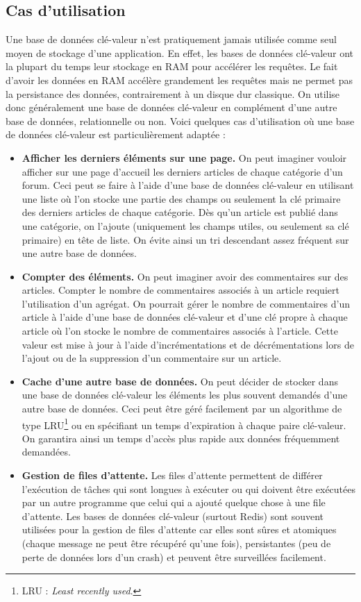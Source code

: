 \subsection{Cas d'utilisation}
	Une base de données clé-valeur n'est pratiquement jamais utilisée comme seul moyen de stockage d'une application. En effet, les bases de données clé-valeur ont la plupart du temps leur stockage en RAM pour accélérer les requêtes. Le fait d'avoir les données en RAM accélère grandement les requêtes mais ne permet pas la persistance des données, contrairement à un disque dur classique. On utilise donc généralement une base de données clé-valeur en complément d'une autre base de données, relationnelle ou non. Voici quelques cas d'utilisation où une base de données clé-valeur est particulièrement adaptée :
	\vspace{10px}
	\begin{itemize}
	 	\item \textbf{Afficher les derniers éléments sur une page.} On peut imaginer vouloir afficher sur une page d'accueil les derniers articles de chaque catégorie d'un forum. Ceci peut se faire à l'aide d'une base de données clé-valeur en utilisant une liste où l'on stocke une partie des champs ou seulement la clé primaire des derniers articles de chaque catégorie. Dès qu'un article est publié dans une catégorie, on l'ajoute (uniquement les champs utiles, ou seulement sa clé primaire) en tête de liste. On évite ainsi un tri descendant assez fréquent sur une autre base de données.
	 	\item \textbf{Compter des éléments.} On peut imaginer avoir des commentaires sur des articles. Compter le nombre de commentaires associés à un article requiert l'utilisation d'un agrégat. On pourrait gérer le nombre de commentaires d'un article à l'aide d'une base de données clé-valeur et d'une clé propre à chaque article où l'on stocke le nombre de commentaires associés à l'article. Cette valeur est mise à jour à l'aide d'incrémentations et de décrémentations lors de l'ajout ou de la suppression d'un commentaire sur un article.
	 	\item \textbf{Cache d'une autre base de données.} On peut décider de stocker dans une base de données clé-valeur les éléments les plus souvent demandés d'une autre base de données. Ceci peut être géré facilement par un algorithme de type LRU\footnote{LRU : \textit{Least recently used}.} ou en spécifiant un temps d'expiration à chaque paire clé-valeur. On garantira ainsi un temps d'accès plus rapide aux données fréquemment demandées.
	 	\item \textbf{Gestion de files d'attente.} Les files d'attente permettent de différer l'exécution de tâches qui sont longues à exécuter ou qui doivent être exécutées par un autre programme que celui qui a ajouté quelque chose à une file d'attente. Les bases de données clé-valeur (surtout Redis) sont souvent utilisées pour la gestion de files d'attente car elles sont sûres et atomiques (chaque message ne peut être récupéré qu'une fois), persistantes (peu de perte de données lors d'un crash) et peuvent être surveillées facilement.

\end{itemize}
